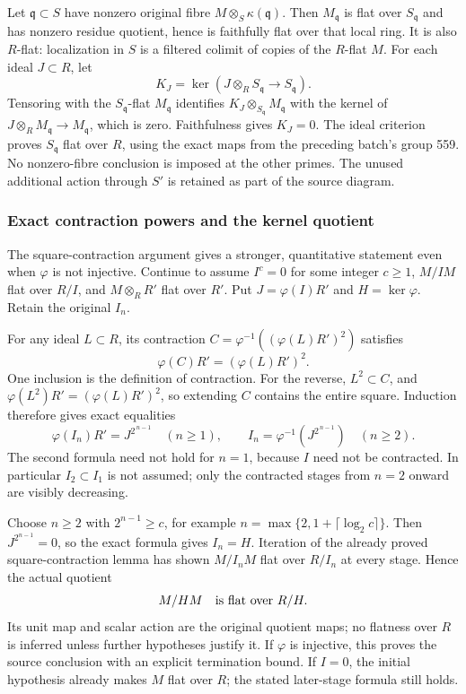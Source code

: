 Let \(\mathfrak q\subset S\) have nonzero original fibre \(M\otimes_S\kappa(\mathfrak q)\). Then \(M_{\mathfrak q}\) is flat over \(S_{\mathfrak q}\) and has nonzero residue quotient, hence is faithfully flat over that local ring. It is also \(R\)-flat: localization in \(S\) is a filtered colimit of copies of the \(R\)-flat \(M\). For each ideal \(J\subset R\), let \[
K_J=\ker(J\otimes_RS_{\mathfrak q}\to S_{\mathfrak q}).
\] Tensoring with the \(S_{\mathfrak q}\)-flat \(M_{\mathfrak q}\) identifies \(K_J\otimes_{S_{\mathfrak q}}M_{\mathfrak q}\) with the kernel of \(J\otimes_RM_{\mathfrak q}\to M_{\mathfrak q}\), which is zero. Faithfulness gives \(K_J=0\). The ideal criterion proves \(S_{\mathfrak q}\) flat over \(R\), using the exact maps from the preceding batch's group 559. No nonzero-fibre conclusion is imposed at the other primes. The unused additional action through \(S'\) is retained as part of the source diagram.

\subsubsection{Exact contraction powers and the kernel quotient}\label{algebra-proof-017-exact-contraction-powers-and-the-kernel-quotient}

The square-contraction argument gives a stronger, quantitative statement even when \(\varphi\) is not injective. Continue to assume \(I^c=0\) for some integer \(c\geq1\), \(M/IM\) flat over \(R/I\), and \(M\otimes_RR'\) flat over \(R'\). Put \(J=\varphi(I)R'\) and \(H=\ker\varphi\). Retain the original \(I_n\).

For any ideal \(L\subset R\), its contraction \(C=\varphi^{-1}((\varphi(L)R')^2)\) satisfies \[
\varphi(C)R'=(\varphi(L)R')^2.
\] One inclusion is the definition of contraction. For the reverse, \(L^2\subset C\), and \(\varphi(L^2)R'=(\varphi(L)R')^2\), so extending \(C\) contains the entire square. Induction therefore gives exact equalities \[
\varphi(I_n)R'=J^{2^{\,n-1}}\quad(n\geq1),
\qquad
I_n=\varphi^{-1}(J^{2^{\,n-1}})\quad(n\geq2).
\] The second formula need not hold for \(n=1\), because \(I\) need not be contracted. In particular \(I_2\subset I_1\) is not assumed; only the contracted stages from \(n=2\) onward are visibly decreasing.

Choose \(n\geq2\) with \(2^{n-1}\geq c\), for example \(n=\max\{2,1+\lceil\log_2c\rceil\}\). Then \(J^{2^{n-1}}=0\), so the exact formula gives \(I_n=H\). Iteration of the already proved square-contraction lemma has shown \(M/I_nM\) flat over \(R/I_n\) at every stage. Hence the actual quotient \[
M/HM\quad\hbox{is flat over }R/H.
\] Its unit map and scalar action are the original quotient maps; no flatness over \(R\) is inferred unless further hypotheses justify it. If \(\varphi\) is injective, this proves the source conclusion with an explicit termination bound. If \(I=0\), the initial hypothesis already makes \(M\) flat over \(R\); the stated later-stage formula still holds.

